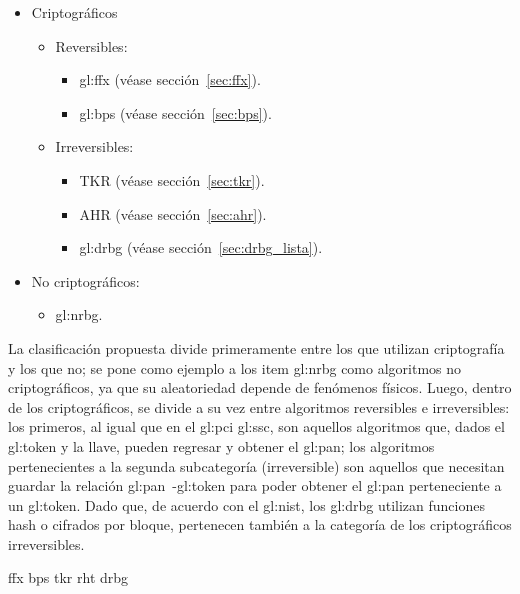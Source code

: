 \begin{itemize}
  \item{Criptográficos}
    \begin{itemize}
      \item Reversibles:
        \begin{itemize}
          \item \Gls{gl:ffx} (véase sección~\ref{sec:ffx}).
          \item \Gls{gl:bps} (véase sección~\ref{sec:bps}).
        \end{itemize}
      \item Irreversibles:
        \begin{itemize}
          \item TKR (véase sección~\ref{sec:tkr}).
          \item AHR (véase sección~\ref{sec:ahr}).
          \item \Gls{gl:drbg} (véase sección~\ref{sec:drbg_lista}).
        \end{itemize}
    \end{itemize}
  \item No criptográficos:
    \begin{itemize}
      \item \gls{gl:nrbg}.
    \end{itemize}
\end{itemize}

La clasificación propuesta divide primeramente entre los que utilizan
criptografía y los que no; se pone como ejemplo a los item \gls{gl:nrbg} como
algoritmos no criptográficos, ya que su aleatoriedad depende de fenómenos
físicos. Luego, dentro de los criptográficos, se divide a su vez entre algoritmos
reversibles e irreversibles: los primeros, al igual que en el
\gls{gl:pci} \gls{gl:ssc}, son aquellos algoritmos que, dados el \gls{gl:token}
y la llave, pueden regresar y obtener el \gls{gl:pan}; los algoritmos
pertenecientes a la segunda subcategoría (irreversible) son aquellos que
necesitan guardar la relación \gls{gl:pan}~-\gls{gl:token} para poder obtener
el \gls{gl:pan} perteneciente a un \gls{gl:token}. Dado que, de acuerdo con el
\gls{gl:nist}, los \gls{gl:drbg} utilizan funciones hash o cifrados por
bloque, pertenecen también a la categoría de los criptográficos irreversibles.

{ffx}
{bps}
{tkr}
{rht}
{drbg}
